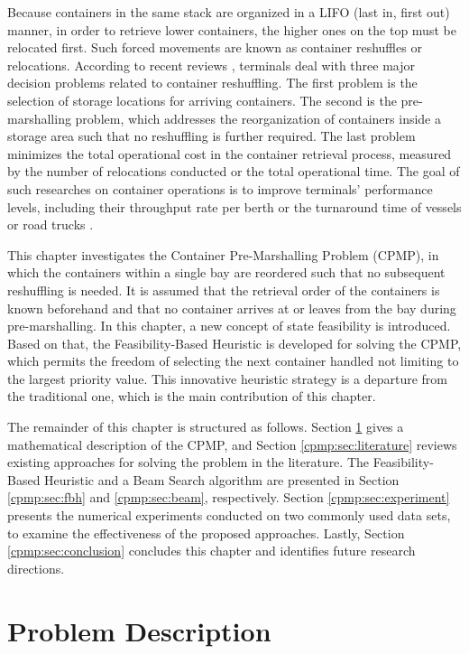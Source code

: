 \documentclass{article}
\begin{document}
Because containers in the same stack are organized in a LIFO (last in, first out) manner, in order to retrieve lower containers, the higher ones on the top must be  relocated first. Such forced movements are known as container reshuffles or relocations. According to recent reviews \citep{Carlo2014412,Lehnfeld2014297}, terminals deal with three major decision problems related to container reshuffling. The first problem is the selection of storage locations for arriving containers. The second is the pre-marshalling problem, which addresses the reorganization of containers inside a storage area such that no reshuffling is further required. The last problem  minimizes the total operational cost in the container retrieval process, measured by the number of relocations conducted or the total operational time. The goal of such researches on container operations is to improve terminals' performance levels, including their throughput rate per berth or the turnaround time of vessels or road trucks \citep{Kim2015}.

This chapter investigates the Container Pre-Marshalling Problem (CPMP), in which the containers within a single bay are reordered such that no subsequent reshuffling is needed. It is assumed that the retrieval order of the containers is known beforehand and that no container arrives at or leaves from the bay during pre-marshalling. In this chapter, a new concept of state feasibility is introduced. Based on that, the Feasibility-Based Heuristic is developed for solving the CPMP, which permits the freedom of selecting the next container handled not limiting to the largest priority value. This innovative heuristic strategy is a departure from the traditional one, which is the main contribution of this chapter. 

The remainder of this chapter is structured as follows. Section \ref{cpmp:sec:problem} gives a mathematical description of the CPMP, and Section \ref{cpmp:sec:literature} reviews existing approaches for solving the problem in the literature.
The Feasibility-Based Heuristic and a Beam Search algorithm are presented in Section \ref{cpmp:sec:fbh} and \ref{cpmp:sec:beam}, respectively. Section \ref{cpmp:sec:experiment} presents the numerical experiments conducted on two commonly used data sets, to examine the effectiveness of the proposed approaches. Lastly, Section \ref{cpmp:sec:conclusion} concludes this chapter and identifies future research directions.



\section{Problem Description}
\label{cpmp:sec:problem}
\end{document}
